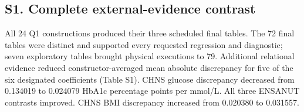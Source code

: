 \documentclass[11pt,letterpaper]{article}
\begin{document}
\subsection*{S1. Complete external-evidence contrast}

All 24 Q1 constructions produced their three scheduled final tables. The 72 final tables were distinct and supported every requested regression and diagnostic; seven exploratory tables brought physical executions to 79. Additional relational evidence reduced constructor-averaged mean absolute discrepancy for five of the six designated coefficients (Table S1). CHNS glucose discrepancy decreased from 0.134019 to 0.024079 HbA1c percentage points per mmol/\allowbreak{}L. All three ENSANUT contrasts improved. CHNS BMI discrepancy increased from 0.020380 to 0.031557.


\FloatBarrier

\begingroup

\small

\renewcommand{\arraystretch}{1.22}
\end{document}

